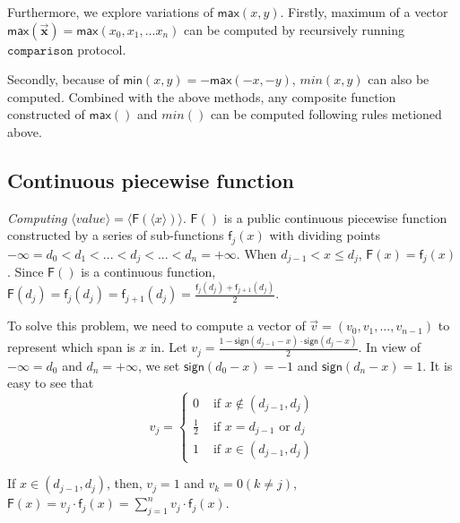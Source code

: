 \documentclass[letterpaper]{article} %
\begin{document}
    Furthermore, we explore variations of $\mathsf{max}(x,y)$.
    Firstly, maximum of a vector $\mathsf{max}(\overrightarrow{\mathbf{x}})=\mathsf{max}(x_{0},x_{1},...x_{n})$
    can be computed by recursively running $\mathtt{comparison}$ protocol.

    Secondly, because of $\mathsf{min}(x,y)=-\mathsf{max}(-x,-y)$,  $min(x,y)$ can also be computed.
    Combined with the above methods,
    any composite function constructed of $\mathsf{max}()$ and $min()$ can be computed following rules metioned above.


    \subsection{Continuous piecewise function}
    \emph{Computing} $\langle value\rangle  = \langle \mathsf{F}(\langle x\rangle)\rangle $.
    $\mathsf{F}()$ is a public continuous piecewise function constructed by a series of sub-functions $\mathsf{f}_{j}(x)$
    with dividing points $-\infty =d_{0}<d_{1}<...<d_{j}<...<d_{n}=+\infty$.
    When $d_{j-1}< x\leq d_{j}$, $\mathsf{F}(x) =\mathsf{f}_{j}(x)$.
    Since $\mathsf{F}()$ is a continuous function, $\mathsf{F}(d_{j}) =\mathsf{f}_{j}(d_{j})=\mathsf{f}_{j+1}(d_{j})=\frac{\mathsf{f}_{j}(d_{j})+\mathsf{f}_{j+1}(d_{j})}{2}$.


    To solve this problem, we need to compute a vector of
    $\overrightarrow{v}=(v_{0},v_{1},...,v_{n-1})$ to represent which span is $x$ in.
    Let $v_{j} = \frac{1-\mathsf{sign}(d_{j-1}-x)\cdot \mathsf{sign}(d_{j}-x)}{2}$.
    In view of $-\infty =d_{0}$ and $d_{n}=+\infty$,
    we set $\mathsf{sign}(d_{0}-x)=-1$ and $\mathsf{sign}(d_{n}-x)=1$.
    It is easy to see that
    $$v_{j}=\begin{cases}
        0 & \text{ if } x\notin (d_{j-1},d_{j}) \\
        \frac{1}{2} & \text{ if } x = d_{j-1} \text{ or } d_{j}\\
        1 & \text{ if } x\in (d_{j-1},d_{j})
        \end{cases}$$

    If $x\in (d_{j-1},d_{j})$, then, $v_{j}=1$ and $v_{k}=0 (k\neq j)$, $\mathsf{F}(x)=v_{j}\cdot \mathsf{f}_{j}(x)=\sum_{j=1}^{n}v_{j}\cdot \mathsf{f}_{j}(x)$.
\end{document}
